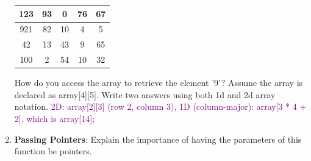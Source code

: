\documentclass{article}
\begin{document}
\begin{enumerate}[label=(\alph*)]
    \begin{center}
    \begin{tabular}{ | c | c | c | c | c |}
    \hline
      123 & 93 & 0 & 76 & 67 \\
      \hline
      921 & 82 & 10 & 4 & 5 \\
      \hline
      42 & 13 & 43 & 9 & 65 \\
      \hline
      100 & 2 & 54 & 10 & 32 \\
      \hline
    \end{tabular}
    \end{center}
    How do you access the array to retrieve the element '9'? Assume the array is declared as array[4][5]. Write two answers using both 1d and 2d array notation.
    \newline
    \newline
    \textcolor{purple}{
        2D: array[2][3] (row 2, column 3),
        1D (column-major): array[3 * 4 + 2], which is array[14];
        }
    
    \item \textbf{Passing Pointers}: Explain the importance of having the parameters of this function be pointers.
    

\end{enumerate}
\end{document}
